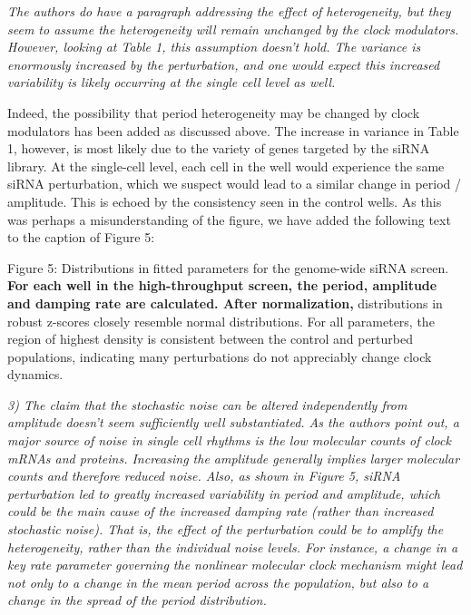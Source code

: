 \documentclass[11pt, letterpaper]{article}
\newenvironment{reviewer}{\itshape\color{gray}}{}
\newenvironment{manuscript}[1]{\begin{center}\begin{tcolorbox}[colback=green!5!white,colframe=green!75!black,width=\textwidth,title={#1},breakable,fonttitle=\bfseries]}{\end{tcolorbox}\end{center}}
\begin{document}
\begin{reviewer}
The authors do have a paragraph addressing the effect of heterogeneity, but they seem to assume the heterogeneity will remain unchanged by the clock modulators. However, looking at Table 1, this assumption doesn't hold. The variance is enormously increased by the perturbation, and one would expect this increased variability is likely occurring at the single cell level as well.
\end{reviewer}

Indeed, the possibility that period heterogeneity may be changed by clock modulators has been added as discussed above.
The increase in variance in Table 1, however, is most likely due to the variety of genes targeted by the siRNA library.
At the single-cell level, each cell in the well would experience the same siRNA perturbation, which we suspect would lead to a similar change in period / amplitude. This is echoed by the consistency seen in the control wells.
As this was perhaps a misunderstanding of the figure, we have added the following text to the caption of Figure 5:

\begin{manuscript}{Page 5}
  Figure 5: Distributions in fitted parameters for the genome-wide siRNA screen. {\bfseries For each well in the high-throughput screen, the period, amplitude and damping rate are calculated. After normalization,} distributions in robust z-scores closely resemble normal distributions. For all parameters, the region of highest density is consistent between the control and perturbed populations, indicating many perturbations do not appreciably change clock dynamics. 
\end{manuscript}

\begin{reviewer}
3) The claim that the stochastic noise can be altered independently from amplitude doesn't seem sufficiently well substantiated. As the authors point out, a major source of noise in single cell rhythms is the low molecular counts of clock mRNAs and proteins. Increasing the amplitude generally implies larger molecular counts and therefore reduced noise. Also, as shown in Figure 5, siRNA perturbation led to greatly increased variability in period and amplitude, which could be the main cause of the increased damping rate (rather than increased stochastic noise). That is, the effect of the perturbation could be to amplify the heterogeneity, rather than the individual noise levels. For instance, a change in a key rate parameter governing the nonlinear molecular clock mechanism might lead not only to a change in the mean period across the population, but also to a change in the spread of the period distribution. 
\end{reviewer}
\end{document}
